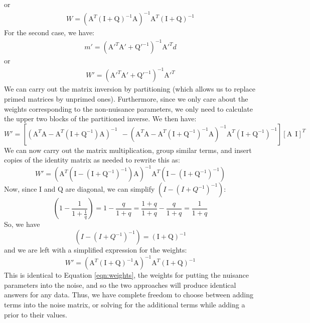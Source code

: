 \documentclass[12]{article}
\begin{document}
or 
\begin{eqnarray}
\label{eqn:weights}
  W=\left(\mathrm{A}^T \left (\mathrm{I+Q} \right
  )^{-1}\mathrm{A}\right )^{-1}\mathrm{A}^T\left (\mathrm{I+Q} \right
  )^{-1}
\end{eqnarray}
For the second case, we have:
\begin{eqnarray}
m'=\left (\mathrm{A'}^T  \mathrm{A'} +\mathrm{Q'}^{-1} \right )^{-1}
\mathrm{A'}^T d
\end{eqnarray}
or
\begin{eqnarray}
  W'=\left (\mathrm{A'}^T  \mathrm{A'} +\mathrm{Q'}^{-1} \right
  )^{-1}\mathrm{A'}^T
\end{eqnarray}
We can carry out the matrix inversion by partitioning (which allows us
to replace primed matrices by unprimed ones).  Furthermore,
since we only care about the weights corresponding to the non-nuisance
parameters, we only need to calculate the upper two blocks of the
partitioned inverse.  We then have:
\begin{equation}
W'=\left [ \left (\mathrm{A}^T\mathrm{A}-\mathrm{A}^T(\mathrm{I}+\mathrm{Q}^{-1})\mathrm{A} \right )^{-1}  \ \ -\left
  (\mathrm{A}^T\mathrm{A}-\mathrm{A}^T (\mathrm{I}+\mathrm{Q}^{-1})^{-1}\mathrm{A}\right )^{-1} \mathrm{A}^T (\mathrm{I}+\mathrm{Q}^{-1})^{-1} \right ]
\left [ \mathrm{A} \ \ \mathrm{I} \right ]^T
\end{equation}
We can now carry out the matrix multiplication, group similar terms,
and insert copies of the identity matrix as needed to rewrite this as:
\begin{equation}
W'=\left (\mathrm{A}^{T} \left (\mathrm{I}-(\mathrm{I}+\mathrm{Q}^{-1})^{-1} \right
)\mathrm{A} \right )^{-1}\mathrm{A}^T 
\left (\mathrm{I}-(\mathrm{I}+\mathrm{Q}^{-1})^{-1} \right )
\end{equation}
Now, since $\mathrm{I}$ and $\mathrm{Q}$ are diagonal, we can simplify
$\left (I-(I+Q^{-1})^{-1} \right )$:
\begin{equation} 
\left (1-\frac{1}{1+\frac{1}{q}} \right ) = 1-\frac{q}{1+q} =
\frac{1+q}{1+q}-\frac{q}{1+q} = \frac{1}{1+q}
\end{equation}
So, we have 
\begin{equation}
\left (I-(I+Q^{-1})^{-1} \right ) = \left
(\mathrm{I}+\mathrm{Q} \right )^{-1}
\end{equation}
and we are left with a simplified expression for the weights:
\begin{equation}
W'=\left (\mathrm{A}^{T} (\mathrm{I}+\mathrm{Q})^{-1} \mathrm{A}
\right )^{-1} \mathrm{A}^T (\mathrm{I}+\mathrm{Q})^{-1}
\end{equation}
This is identical to Equation \ref{eqn:weights}, the weights for
putting the nuisance parameters into the noise, and so the two
approaches will produce identical answers for any data.  Thus, we have
complete freedom to choose between adding terms into the noise matrix,
or solving for the additional terms while adding a prior to their
values.
\end{document}
